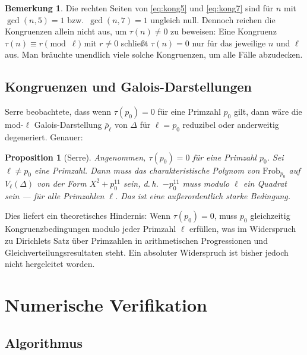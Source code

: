 \documentclass[12pt,a4paper]{amsart}
\newtheorem{proposition}[theorem]{Proposition}
\theoremstyle{definition}
\newtheorem{remark}[theorem]{Bemerkung}
\begin{document}
\begin{remark}
  Die rechten Seiten von \eqref{eq:kong5} und \eqref{eq:kong7} sind für $n$ mit
  $\gcd(n, 5) = 1$ bzw.\ $\gcd(n, 7) = 1$ ungleich null. Dennoch reichen die
  Kongruenzen allein nicht aus, um $\tau(n) \neq 0$ zu beweisen: Eine Kongruenz
  $\tau(n) \equiv r \pmod{\ell}$ mit $r \neq 0$ schließt $\tau(n) = 0$ nur für
  das jeweilige $n$ und $\ell$ aus. Man bräuchte unendlich viele solche Kongruenzen,
  um alle Fälle abzudecken.
\end{remark}

\subsection{Kongruenzen und Galois-Darstellungen}

Serre \cite{Serre1987} beobachtete, dass wenn $\tau(p_0) = 0$ für eine Primzahl
$p_0$ gilt, dann wäre die mod-$\ell$ Galois-Darstellung $\bar\rho_\ell$ von
$\Delta$ für $\ell = p_0$ reduzibel oder anderweitig degeneriert. Genauer:

\begin{proposition}[Serre]\label{prop:serre-galois}
  Angenommen, $\tau(p_0) = 0$ für eine Primzahl $p_0$. Sei $\ell \neq p_0$ eine
  Primzahl. Dann muss das charakteristische Polynom von $\mathrm{Frob}_{p_0}$
  auf $V_\ell(\Delta)$ von der Form $X^2 + p_0^{11}$ sein, d.\,h.\ $-p_0^{11}$
  muss modulo $\ell$ ein Quadrat sein --- für \emph{alle} Primzahlen $\ell$. Das
  ist eine außerordentlich starke Bedingung.
\end{proposition}

Dies liefert ein theoretisches Hindernis: Wenn $\tau(p_0) = 0$, muss $p_0$
gleichzeitig Kongruenzbedingungen modulo jeder Primzahl $\ell$ erfüllen, was im
Widerspruch zu Dirichlets Satz über Primzahlen in arithmetischen Progressionen
und Gleichverteilungsresultaten steht. Ein absoluter Widerspruch ist bisher jedoch
nicht hergeleitet worden.

\section{Numerische Verifikation}

\subsection{Algorithmus}
\end{document}
